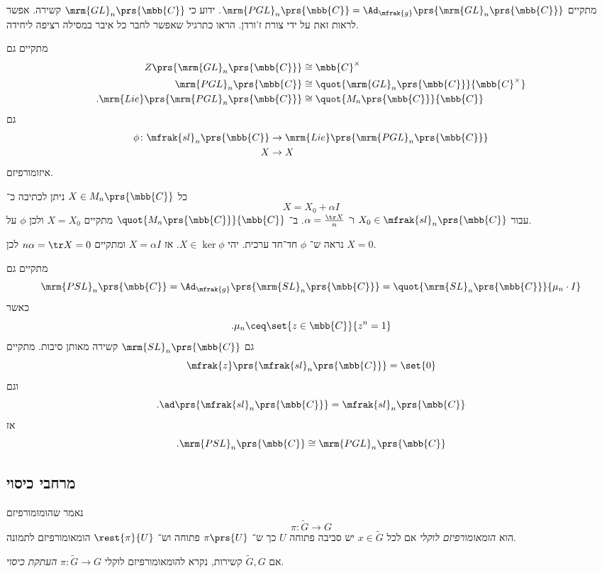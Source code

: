 \documentclass[10pt, twoside]{book}
\newcommand{\Lie}{\mrm{Lie}}
\begin{document}
\begin{example}
מתקיים
$\mrm{PGL}_n\prs{\mbb{C}} = \Ad_{\mfrak{g}}\prs{\mrm{GL}_n\prs{\mbb{C}}}$.
ידוע כי
$\mrm{GL}_n\prs{\mbb{C}}$
קשירה. אפשר לראות זאת על ידי צורת ז'ורדן.
הראו כתרגיל שאפשר לחבר כל איבר במסילה רציפה ליחידה.

מתקיים גם
\begin{align*}
Z\prs{\mrm{GL}_n\prs{\mbb{C}}} &\cong \mbb{C}^\times \\
\mrm{PGL}_n\prs{\mbb{C}} &\cong \quot{\mrm{GL}_n\prs{\mbb{C}}}{\mbb{C}^\times} \\
\text{.} \Lie\prs{\mrm{PGL}_n\prs{\mbb{C}}} &\cong \quot{M_n\prs{\mbb{C}}}{\mbb{C}}
\end{align*}
גם
\begin{align*}
\phi \colon \mfrak{sl}_n\prs{\mbb{C}} &\to \Lie\prs{\mrm{PGL}_n\prs{\mbb{C}}} \\
X &\to X
\end{align*}
איזומורפיזם.

כל
$X \in M_n\prs{\mbb{C}}$
ניתן לכתיבה כ־%
\[X = X_0 + \alpha I\]
עבור
$X_0 \in \mfrak{sl}_n\prs{\mbb{C}}$
ו־%
$\alpha = \frac{\tr X}{n}$.
ב־%
$\quot{M_n\prs{\mbb{C}}}{\mbb{C}}$
מתקיים
$X = X_0$
ולכן
$\phi$
על.

נראה ש־%
$\phi$
חד־חד ערכית. יהי
$X \in \ker \phi$.
אז
$X = \alpha I$
ומתקיים
$n \alpha = \tr X = 0$
לכן
$X = 0$.

מתקיים גם
\[ \mrm{PSL}_n\prs{\mbb{C}} = \Ad_{\mfrak{g}}\prs{\mrm{SL}_n\prs{\mbb{C}}} = \quot{\mrm{SL}_n\prs{\mbb{C}}}{\mu_n \cdot I}\]
כאשר
\[\text{.} \mu_n \ceq \set{z \in \mbb{C}}{z^n = 1}\]
גם
$\mrm{SL}_n\prs{\mbb{C}}$
קשירה מאותן סיבות. מתקיים
\[\mfrak{z}\prs{\mfrak{sl}_n\prs{\mbb{C}}} = \set{0}\]
וגם
\[\text{.} \ad\prs{\mfrak{sl}_n\prs{\mbb{C}}} = \mfrak{sl}_n\prs{\mbb{C}}\]
אז
\[\text{.} \mrm{PSL}_n\prs{\mbb{C}} \cong \mrm{PGL}_n\prs{\mbb{C}}\]
\end{example}

\subsection{מרחבי כיסוי}

\begin{definition}
נאמר שהומומורפיזם
\[\pi \colon \tilde{G} \to G\]
הוא
\emph{הומאומורפיזם לוקלי}
אם לכל
$x \in \tilde{G}$
יש סביבה פתוחה
$U$
כך ש־%
$\pi\prs{U}$
פתוחה וש־%
$\rest{\pi}{U}$
הומאומורפיזם לתמונה.
\end{definition}

\begin{definition}
אם
$\tilde{G}, G$
קשירות, נקרא להומאומורפיזם לוקלי
$\pi \colon \tilde{G} \to G$
\emph{העתקת כיסוי}.
\end{definition}
\end{document}

